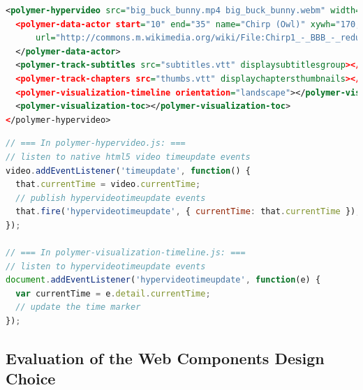 \documentclass[runningheads,a4paper]{llncs}
\begin{document}
\begin{lstlisting}[caption={Web Components mark-up for the hypervideo in \autoref{fig:screenshot}, including subtitles, chapters, timeline, and table of contents; the actor annotation contains a spatial fragment
(\texttt{xywh})~\cite{troncy2012mediafragments} and a~link (\texttt{url})
  to Wikimedia Commons},
  label=listing:polymer, language=xml,
  float=htb!, stringstyle=\color{gray},morekeywords={polymer,hypervideo,track,subtitles,chapters,toc,timeline,visualization,data,actor,src,end,start,name,url,width,height,muted,displaysubtitlesgroup,orientation,displaychaptersthumbnails,xywh}]
<polymer-hypervideo src="big_buck_bunny.mp4 big_buck_bunny.webm" width="400" height="225" muted>
  <polymer-data-actor start="10" end="35" name="Chirp (Owl)" xywh="170,20,70,80" 
      url="http://commons.m.wikimedia.org/wiki/File:Chirp1_-_BBB_-_reduced_snapshot.png">
  </polymer-data-actor>
  <polymer-track-subtitles src="subtitles.vtt" displaysubtitlesgroup></polymer-track-subtitles>
  <polymer-track-chapters src="thumbs.vtt" displaychaptersthumbnails></polymer-track-chapters>
  <polymer-visualization-timeline orientation="landscape"></polymer-visualization-timeline>
  <polymer-visualization-toc></polymer-visualization-toc>
</polymer-hypervideo>
\end{lstlisting}

\begin{lstlisting}[caption={Native JavaScript event communication
  between Web Components},
  label=listing:events, language=JavaScript,
  float=htb!, stringstyle=\color{gray},morekeywords={addEventListener,document}]
// === In polymer-hypervideo.js: ===
// listen to native html5 video timeupdate events
video.addEventListener('timeupdate', function() {
  that.currentTime = video.currentTime;
  // publish hypervideotimeupdate events
  that.fire('hypervideotimeupdate', { currentTime: that.currentTime });
});

// === In polymer-visualization-timeline.js: ===
// listen to hypervideotimeupdate events
document.addEventListener('hypervideotimeupdate', function(e) {
  var currentTime = e.detail.currentTime;
  // update the time marker
});
\end{lstlisting}

\subsection{Evaluation of the Web Components Design Choice}
\end{document}
